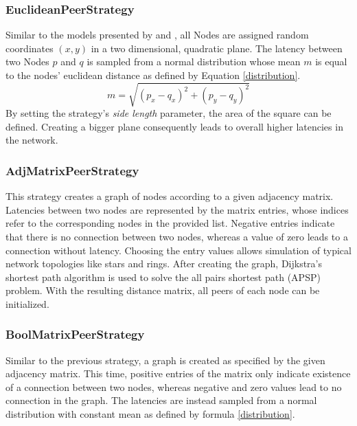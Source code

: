 \documentclass[a4paper,12pt,twoside]{report}
\begin{document}
\subsubsection{EuclideanPeerStrategy}
Similar to the models presented by \cite{mwalemodel} and \cite{selfishmine2}, all Nodes are assigned random coordinates $(x,y)$ in a two dimensional, quadratic plane. The latency between two Nodes $p$ and $q$ is sampled from a normal distribution whose mean $m$ is equal to the nodes' euclidean distance as defined by Equation \ref{distribution}.
\begin{equation}\label{euclid}
m = \sqrt{(p_{x}-q_{x})^{2}+(p_{y}-q_{y})^{2}}
\end{equation}
By setting the strategy's \textit{side length} parameter, the area of the square can be defined. Creating a bigger plane consequently leads to overall higher latencies in the network.
\subsubsection{AdjMatrixPeerStrategy}
This strategy creates a graph of nodes according to a given adjacency matrix. Latencies between two nodes are represented by the matrix entries, whose indices refer to the corresponding nodes in the provided list. Negative entries indicate that there is no connection between two nodes, whereas a value of zero leads to a connection without latency. Choosing the entry values allows simulation of typical network topologies like stars and rings. After creating the graph, Dijkstra's shortest path algorithm\cite{dijkstra} is used to solve the all pairs shortest path (APSP) problem. With the resulting distance matrix, all peers of each node can be initialized.
\subsubsection{BoolMatrixPeerStrategy}
Similar to the previous strategy, a graph is created as specified by the given adjacency matrix. This time, positive entries of the matrix only indicate existence of a connection between two nodes, whereas negative and zero values lead to no connection in the graph. The latencies are instead sampled from a normal distribution with constant mean as defined by formula \ref{distribution}.
\end{document}
